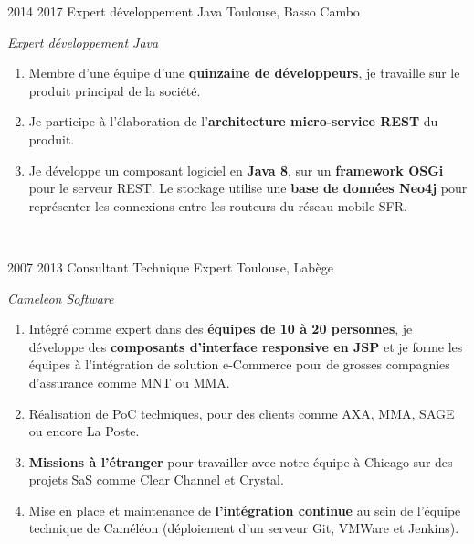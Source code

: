 \documentclass{friggeri-cv} 	%
\begin{document}
\begin{entrylist}
\entry
{2014  2017}
{Expert développement Java}
{Toulouse, Basso Cambo}
{\vspace{-0.4cm}\emph{Expert développement Java} \\
\begin{enumerate}[leftmargin=-1cm]
    \item Membre d’une équipe d’une \textbf{quinzaine de développeurs}, je travaille sur le produit principal de la société.
    \item Je participe à l’élaboration de l’\textbf{architecture micro-service REST} du produit.
    \item Je développe un composant logiciel en \textbf{Java 8}, sur un \textbf{framework OSGi} pour le serveur REST. 
        Le stockage utilise une \textbf{base de données Neo4j} pour représenter les connexions entre les routeurs du réseau mobile SFR.
\end{enumerate}
\
}
\end{entrylist}
\begin{entrylist}
\entry
{2007  2013}
{Consultant Technique Expert}
{Toulouse, Labège}
{\vspace{-0.4cm}\emph{Cameleon Software} \\
\begin{enumerate}[leftmargin=-1cm]
\item Intégré comme expert dans des \textbf{équipes de 10 à 20 personnes}, je développe des \textbf{composants d’interface responsive en JSP} et je forme les équipes à l’intégration de solution e-Commerce pour de grosses compagnies d’assurance comme MNT ou MMA.
\item Réalisation de PoC techniques, pour des clients comme AXA, MMA, SAGE ou encore La Poste.
\item \textbf{Missions à l’étranger} pour travailler avec notre équipe à Chicago sur des projets SaS comme Clear Channel et Crystal.
\item Mise en place et maintenance de \textbf{l’intégration continue} au sein de l’équipe technique de Caméléon (déploiement d’un serveur Git, VMWare et Jenkins).
\end{enumerate}
\
}
\end{entrylist}
\end{document}
